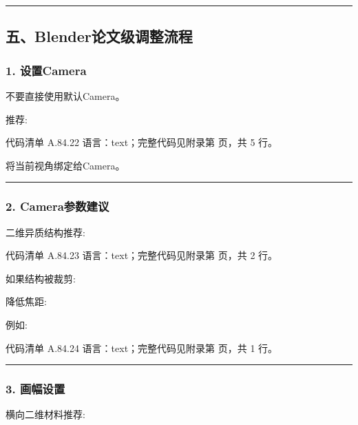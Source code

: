 \documentclass[lang=cn,scheme=chinese,color=blue,device=normal,toc=onecol,math=cm]{elegantbook}
\begin{document}
\medskip\hrule\medskip


\subsection{五、Blender论文级调整流程}


\subsubsection{1. 设置Camera}


不要直接使用默认Camera。\par


推荐:\par


\begin{codeindexbox}{代码清单 A.84.22}
语言：text；完整代码见附录第 \pageref{code:84:22} 页，共 5 行。
\end{codeindexbox}


将当前视角绑定给Camera。\par


\medskip\hrule\medskip


\subsubsection{2. Camera参数建议}


二维异质结构推荐:\par


\begin{codeindexbox}{代码清单 A.84.23}
语言：text；完整代码见附录第 \pageref{code:84:23} 页，共 2 行。
\end{codeindexbox}


如果结构被裁剪:\par


降低焦距:\par


例如:\par


\begin{codeindexbox}{代码清单 A.84.24}
语言：text；完整代码见附录第 \pageref{code:84:24} 页，共 1 行。
\end{codeindexbox}


\medskip\hrule\medskip


\subsubsection{3. 画幅设置}


横向二维材料推荐:\par
\end{document}
